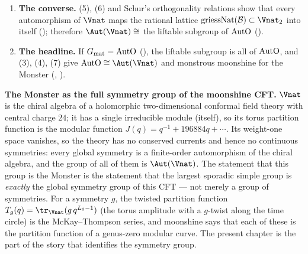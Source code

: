 \begin{enumerate}[label=(\arabic*)]
  $\chtwentytwoGmat$ is $a\cdot1+b\cdot P_0$, $P_0$ the projection onto the line of the identity element
  ().
\item \textbf{The converse.}  (5), (6) and Schur's orthogonality relations show that every automorphism of $\Vnat$
  maps the rational lattice $\mathrm{griessNat}(\chtwentytwoB)\subset\Vnat_2$ into itself ();
  therefore $\Aut(\Vnat)\cong$ the liftable subgroup of $\mathrm{AutO}$ ().
\item \textbf{The headline.}  If $G_{\mathrm{mat}}=\mathrm{AutO}$ (), the liftable subgroup is all of
  $\mathrm{AutO}$, and (3), (4), (7) give $\chtwentytwoAutO\cong\Aut(\Vnat)$ and monstrous moonshine for the Monster
  (, ).
\end{enumerate}

\begin{physics}
\textbf{The Monster as the full symmetry group of the moonshine CFT.}  $\Vnat$ is the chiral algebra of a
holomorphic two-dimensional conformal field theory with central charge $24$; it has a single irreducible module
(itself), so its torus partition function is the modular function $J(q)=q^{-1}+196884q+\cdots$.  Its weight-one
space vanishes, so the theory has no conserved currents and hence no continuous symmetries: every global symmetry
is a finite-order automorphism of the chiral algebra, and the group of all of them is $\Aut(\Vnat)$.  The
statement that this group is the Monster is the statement that the largest sporadic simple group is \emph{exactly}
the global symmetry group of this CFT --- not merely a group of symmetries.  For a symmetry $g$, the twisted
partition function $T_g(q)=\tr_{\Vnat}(g\,q^{L_0-1})$ (the torus amplitude with a $g$-twist along the time
circle) is the McKay--Thompson series, and moonshine says that each of these is the partition function of a
genus-zero modular curve.  The present chapter is the part of the story that identifies the symmetry group.
\end{physics}

